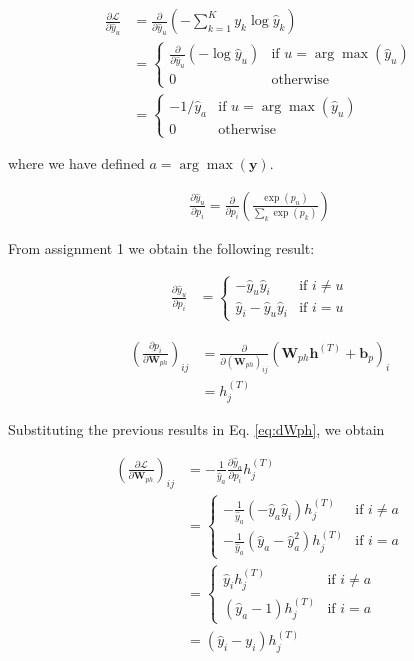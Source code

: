 \documentclass{article}
\newcommand{\pd}[2]{\frac{\partial #1}{\partial #2}}
\begin{document}
\begin{align*}
\pd{\mathcal{L}}{\hat{y}_u} &= \pd{}{\hat{y}_u}\left(-\sum_{k=1}^K y_{k} \log\hat{y}_k\right) \\
&=
\left\lbrace
\begin{matrix}
\pd{}{\hat{y}_u}(-\log \hat{y}_u) & \text{if } u = \arg\max(\hat{y}_u) \\
0 & \text{otherwise}
\end{matrix}
\right.\\
&=
\left\lbrace
\begin{matrix}
-1/\hat{y}_a & \text{if } u = \arg\max(\hat{y}_u) \\
0 & \text{otherwise}
\end{matrix}
\right.
\end{align*}

where we have defined $a = \arg\max(\mathbf{y})$.

\begin{align*}
\pd{\hat{y}_u}{p_i} = \pd{}{p_i}\left(\frac{\exp(p_u)}{\sum_k\exp(p_k)}  \right)
\end{align*}

From assignment 1 we obtain the following result:

\begin{align*}
\pd{\hat{y}_u}{p_i} &=
\left\lbrace
\begin{matrix}
-\hat{y}_u\hat{y}_i & \text{if } i \neq u \\
\hat{y}_i -\hat{y}_u\hat{y}_i & \text{if } i = u
\end{matrix}
\right.
\end{align*}

\begin{align*}
\left(\pd{p_i}{\mathbf{W}_{ph}} \right)_{ij} &= \pd{}{(\mathbf{W}_{ph})_{ij}}(\mathbf{W}_{ph}\mathbf{h}^{(T)} + \mathbf{b}_p)_i \\
&= h^{(T)}_j
\end{align*}

Substituting the previous results in Eq. \ref{eq:dWph}, we obtain

\begin{align*}
\left(\pd{\mathcal{L}}{\mathbf{W}_{ph}}\right)_{ij} &= -\frac{1}{\hat{y}_a} \pd{\hat{y}_a}{p_i}h_j^{(T)} \\
&=
\left\lbrace
\begin{matrix}
-\frac{1}{\hat{y}_a}(-\hat{y}_a\hat{y}_i)h_j^{(T)} & \text{if } i \neq a \\
-\frac{1}{\hat{y}_a}(\hat{y}_a -\hat{y}_a^2)h_j^{(T)} & \text{if } i = a
\end{matrix}
\right.\\
&=
\left\lbrace
\begin{matrix}
\hat{y}_i h_j^{(T)} & \text{if } i \neq a \\
(\hat{y}_a - 1)h_j^{(T)} & \text{if } i = a
\end{matrix}
\right.\\
&= (\hat{y}_i - y_i)h_j^{(T)}
\end{align*}
\end{document}
